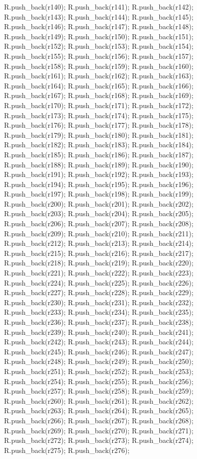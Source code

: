 \begin{DoxyCode}
{R.push_back(r140);
R.push_back(r141);
R.push_back(r142);
R.push_back(r143);
R.push_back(r144);
R.push_back(r145);
R.push_back(r146);
R.push_back(r147);
R.push_back(r148);
R.push_back(r149);
R.push_back(r150);
R.push_back(r151);
R.push_back(r152);
R.push_back(r153);
R.push_back(r154);
R.push_back(r155);
R.push_back(r156);
R.push_back(r157);
R.push_back(r158);
R.push_back(r159);
R.push_back(r160);
R.push_back(r161);
R.push_back(r162);
R.push_back(r163);
R.push_back(r164);
R.push_back(r165);
R.push_back(r166);
R.push_back(r167);
R.push_back(r168);
R.push_back(r169);
R.push_back(r170);
R.push_back(r171);
R.push_back(r172);
R.push_back(r173);
R.push_back(r174);
R.push_back(r175);
R.push_back(r176);
R.push_back(r177);
R.push_back(r178);
R.push_back(r179);
R.push_back(r180);
R.push_back(r181);
R.push_back(r182);
R.push_back(r183);
R.push_back(r184);
R.push_back(r185);
R.push_back(r186);
R.push_back(r187);
R.push_back(r188);
R.push_back(r189);
R.push_back(r190);
R.push_back(r191);
R.push_back(r192);
R.push_back(r193);
R.push_back(r194);
R.push_back(r195);
R.push_back(r196);
R.push_back(r197);
R.push_back(r198);
R.push_back(r199);
R.push_back(r200);
R.push_back(r201);
R.push_back(r202);
R.push_back(r203);
R.push_back(r204);
R.push_back(r205);
R.push_back(r206);
R.push_back(r207);
R.push_back(r208);
R.push_back(r209);
R.push_back(r210);
R.push_back(r211);
R.push_back(r212);
R.push_back(r213);
R.push_back(r214);
R.push_back(r215);
R.push_back(r216);
R.push_back(r217);
R.push_back(r218);
R.push_back(r219);
R.push_back(r220);
R.push_back(r221);
R.push_back(r222);
R.push_back(r223);
R.push_back(r224);
R.push_back(r225);
R.push_back(r226);
R.push_back(r227);
R.push_back(r228);
R.push_back(r229);
R.push_back(r230);
R.push_back(r231);
R.push_back(r232);
R.push_back(r233);
R.push_back(r234);
R.push_back(r235);
R.push_back(r236);
R.push_back(r237);
R.push_back(r238);
R.push_back(r239);
R.push_back(r240);
R.push_back(r241);
R.push_back(r242);
R.push_back(r243);
R.push_back(r244);
R.push_back(r245);
R.push_back(r246);
R.push_back(r247);
R.push_back(r248);
R.push_back(r249);
R.push_back(r250);
R.push_back(r251);
R.push_back(r252);
R.push_back(r253);
R.push_back(r254);
R.push_back(r255);
R.push_back(r256);
R.push_back(r257);
R.push_back(r258);
R.push_back(r259);
R.push_back(r260);
R.push_back(r261);
R.push_back(r262);
R.push_back(r263);
R.push_back(r264);
R.push_back(r265);
R.push_back(r266);
R.push_back(r267);
R.push_back(r268);
R.push_back(r269);
R.push_back(r270);
R.push_back(r271);
R.push_back(r272);
R.push_back(r273);
R.push_back(r274);
R.push_back(r275);
R.push_back(r276);
}
\end{DoxyCode}
